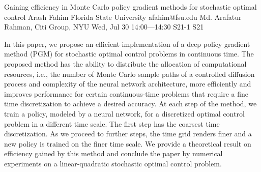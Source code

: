 \begin{talk}
  {Gaining efficiency in Monte Carlo policy gradient methods for stochastic optimal control}%
  {Arash Fahim}%
  {Florida State University}%
  {afahim@fsu.edu}%
  {Md. Arafatur Rahman, Citi Group, NYU}%
  {}%
  {Wed, Jul 30 14:00---14:30}%
  {S21-1}%
  {S21}%
  
    
   
In this paper, we propose an efficient implementation of a deep policy gradient method (PGM) for stochastic optimal control problems in continuous time. The proposed method has the ability to distribute the allocation of computational resources, i.e., the number of Monte Carlo  sample paths of a controlled diffusion process and complexity of the neural network architecture, more efficiently and improves performance for certain continuous-time problems that require a fine time discretization to achieve a desired accuracy. At each step of the method, we train a policy, modeled by a neural network, for a discretized optimal control problem in a different time scale. The first step has the coarsest time discretization. As we proceed to further steps, the time grid renders finer and a new policy is trained on the finer time scale. We provide a theoretical result on efficiency gained by this method and conclude the paper by numerical experiments on a linear-quadratic stochastic optimal control problem.

\medskip


\end{talk}

